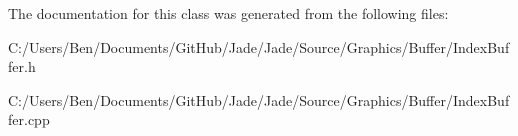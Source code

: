 The documentation for this class was generated from the following files\+:\begin{DoxyCompactItemize}
\item 
C\+:/\+Users/\+Ben/\+Documents/\+Git\+Hub/\+Jade/\+Jade/\+Source/\+Graphics/\+Buffer/Index\+Buffer.\+h\item 
C\+:/\+Users/\+Ben/\+Documents/\+Git\+Hub/\+Jade/\+Jade/\+Source/\+Graphics/\+Buffer/Index\+Buffer.\+cpp\end{DoxyCompactItemize}
